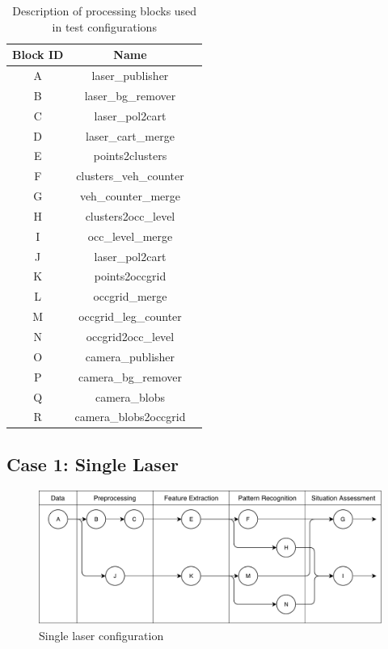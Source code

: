 \begin{table}[ht!]
\footnotesize
\centering
\begin{tabular}{|c | c| c|}
\hline
\textbf{Block ID} & \textbf{Name} \\
\hline
A & laser\_publisher \\
\hline
B & laser\_bg\_remover \\
\hline
C & laser\_pol2cart \\
\hline
D & laser\_cart\_merge \\
\hline
E & points2clusters \\
\hline
F & clusters\_veh\_counter \\
\hline
G & veh\_counter\_merge \\
\hline
H & clusters2occ\_level \\
\hline
I & occ\_level\_merge \\
\hline
J & laser\_pol2cart \\
\hline
K & points2occgrid \\
\hline
L & occgrid\_merge \\
\hline
M & occgrid\_leg\_counter \\
\hline
N & occgrid2occ\_level \\
\hline
O & camera\_publisher \\
\hline
P & camera\_bg\_remover \\
\hline
Q & camera\_blobs \\
\hline
R & camera\_blobs2occgrid \\
\hline
\end{tabular}
\caption{Description of processing blocks used in test configurations}
\label{desc_test_config}
\end{table}


\subsection{Case 1: Single Laser}

\begin{figure}[ht!]
\centering
\includegraphics[scale=0.7]{fig/4/test_configuration1.pdf}
\caption{Single laser configuration}
\label{tconf1}
\end{figure}

